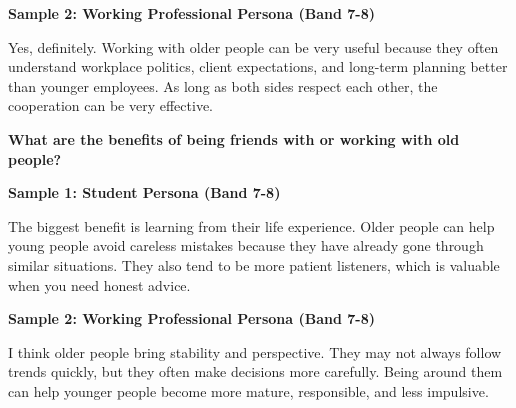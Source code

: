 \textbf{Sample 2: Working Professional Persona (Band 7-8)}

Yes, definitely. Working with older people can be very useful because they often understand workplace politics, client expectations, and long-term planning better than younger employees. As long as both sides respect each other, the cooperation can be very effective.

\separator

\begin{ieltsquestion}
\textbf{What are the benefits of being friends with or working with old people?}
\end{ieltsquestion}
\textbf{Sample 1: Student Persona (Band 7-8)}

The biggest benefit is learning from their life experience. Older people can help young people avoid careless mistakes because they have already gone through similar situations. They also tend to be more patient listeners, which is valuable when you need honest advice.

\textbf{Sample 2: Working Professional Persona (Band 7-8)}

I think older people bring stability and perspective. They may not always follow trends quickly, but they often make decisions more carefully. Being around them can help younger people become more mature, responsible, and less impulsive.

\separator


